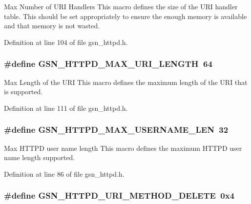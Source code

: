 Max Number of URI Handlers This macro defines the size of the URI handler table. This should be set appropriately to ensure the enough memory is available and that memory is not wasted. 



Definition at line 104 of file gsn\_\-httpd.h.

\hypertarget{a00666_ga95da763c129195cbff1fce21503d6406}{
\subsubsection[{GSN\_\-HTTPD\_\-MAX\_\-URI\_\-LENGTH}]{\setlength{\rightskip}{0pt plus 5cm}\#define GSN\_\-HTTPD\_\-MAX\_\-URI\_\-LENGTH~64}}
\label{a00666_ga95da763c129195cbff1fce21503d6406}


Max Length of the URI This macro defines the maximum length of the URI that is supported. 



Definition at line 111 of file gsn\_\-httpd.h.

\hypertarget{a00666_ga2a0e4d865dc418b0c680dfd0e55a91f8}{
\subsubsection[{GSN\_\-HTTPD\_\-MAX\_\-USERNAME\_\-LEN}]{\setlength{\rightskip}{0pt plus 5cm}\#define GSN\_\-HTTPD\_\-MAX\_\-USERNAME\_\-LEN~32}}
\label{a00666_ga2a0e4d865dc418b0c680dfd0e55a91f8}


Max HTTPD user name length This macro defines the maximum HTTPD user name length supported. 



Definition at line 86 of file gsn\_\-httpd.h.

\hypertarget{a00666_ga2c713aa7f2f3beef019826bca59fae7a}{
\subsubsection[{GSN\_\-HTTPD\_\-URI\_\-METHOD\_\-DELETE}]{\setlength{\rightskip}{0pt plus 5cm}\#define GSN\_\-HTTPD\_\-URI\_\-METHOD\_\-DELETE~0x4}}
\label{a00666_ga2c713aa7f2f3beef019826bca59fae7a}


